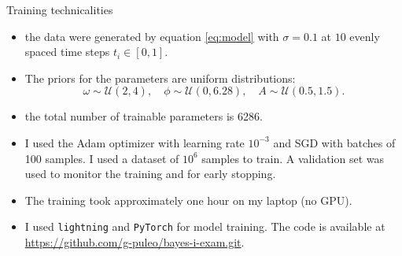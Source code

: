 \documentclass{beamer}
\begin{document}
\begin{frame}[fragile]{Training technicalities}
\begin{itemize}
    \item the data were generated by equation \eqref{eq:model} with $\sigma = 0.1$ at $10$ evenly spaced time steps $t_i \in [0, 1]$. 
    \item The priors for the parameters are uniform distributions:
        \begin{equation}
            \omega \sim \mathcal{U}(2, 4), \quad \phi \sim \mathcal{U}(0, 6.28), \quad A \sim \mathcal{U}(0.5, 1.5).
        \end{equation}
    \item the total number of trainable parameters is 6286.
    \item I used the Adam optimizer with learning rate $10^{-3}$ and SGD with batches of 100 samples. I used a dataset of $10^6$ samples to train. 
          A validation set was used to monitor the training and for early stopping.
    \item The training took approximately one hour on my laptop (no GPU).
    \item I used \verb|lightning| and \verb|PyTorch| for model training. The code is available at 
          \href{https://github.com/g-puleo/bayes-i-exam.git}{https://github.com/g-puleo/bayes-i-exam.git}.
\end{itemize}
\end{frame}
\end{document}
